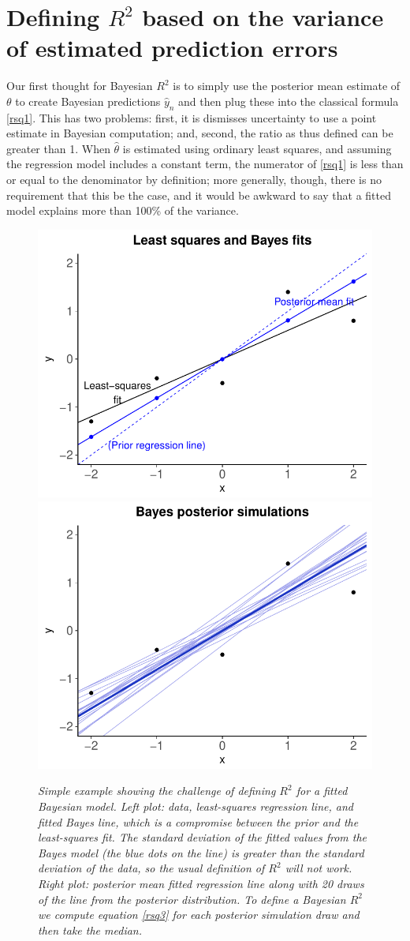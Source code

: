 \documentclass[11pt]{article}
\begin{document}
\section{Defining $R^2$ based on the variance of estimated prediction errors}

Our first thought for Bayesian $R^2$ is to simply use the posterior mean
estimate of $\theta$ to create Bayesian predictions $\hat{y}_n$ and then plug
these into the classical formula \eqref{rsq1}.  This has two problems:  first,
it is dismisses uncertainty to use a point estimate in Bayesian computation;
and, second, the ratio as thus defined can be greater than 1.  When
$\hat{\theta}$ is estimated using ordinary least squares, and assuming the
regression model includes a constant term, the numerator of \eqref{rsq1} is less
than or equal to the denominator by definition; more generally, though, there is
no requirement that this be the case, and it would be awkward to say that a
fitted model explains more than 100\% of the variance.

\begin{figure}
\centerline{\includegraphics[width=.5\textwidth]{fig/rsquared1a-gg.pdf}\includegraphics[width=.5\textwidth]{fig/rsquared1b-gg.pdf}}
\vspace{-.1in}
\caption{\em Simple example showing the challenge of defining $R^2$ for a fitted
Bayesian model.  {\em Left plot:}  data, least-squares regression line, and
fitted Bayes line, which is a compromise between the prior and the least-squares
fit.  The standard deviation of the fitted values from the Bayes model (the blue
dots on the line) is greater than the standard deviation of the data, so the
usual definition of $R^2$ will not work.  {\em Right plot:}  posterior mean
fitted regression line along with 20 draws of the line from the posterior
distribution.  To define a Bayesian $R^2$ we compute equation
\eqref{rsq3} for each posterior simulation draw and then take the median.}
\label{rsquared1}
\end{figure}
\end{document}
